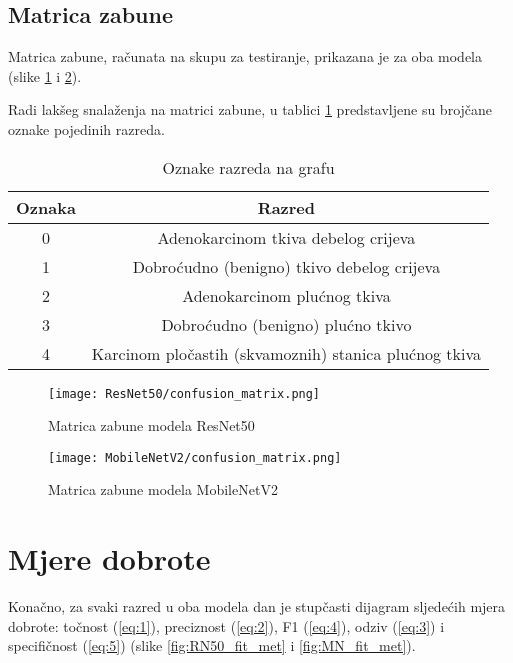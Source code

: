 \documentclass[conference, utf8]{IEEEtran}
\begin{document}
\pagebreak

\subsection{Matrica zabune}
Matrica zabune, računata na skupu za testiranje, prikazana je za oba modela (slike \ref{fig:RN50_conf_mat} i \ref{fig:MN_conf_mat}).

Radi lakšeg snalaženja na matrici zabune, u tablici \ref{table:3} predstavljene su brojčane oznake pojedinih razreda.

\begin{table}[ht]
	\centering
	\caption{Oznake razreda na grafu}
	\label{table:3}
	\begin{tabular}{ |c|c| } 
		\hline
		Oznaka & Razred \\
		\hline \hline
		0 & Adenokarcinom tkiva debelog crijeva \\
		\hline
		1 & Dobroćudno (benigno) tkivo debelog crijeva \\
		\hline
		2 & Adenokarcinom plućnog tkiva \\
		\hline
		3 & Dobroćudno (benigno) plućno tkivo \\
		\hline
		4 & Karcinom pločastih (skvamoznih) stanica plućnog tkiva \\
		\hline
	\end{tabular}
\end{table}


\begin{figure}[ht]
	\centering
	\texttt{[image: ResNet50/confusion\_matrix.png]}
	\caption{Matrica zabune modela ResNet50}
	\label{fig:RN50_conf_mat}
\end{figure}


\begin{figure}[ht]
	\centering
	\texttt{[image: MobileNetV2/confusion\_matrix.png]}
	\caption{Matrica zabune modela MobileNetV2}
	\label{fig:MN_conf_mat}
\end{figure}
\pagebreak



\section{Mjere dobrote}
 Konačno, za svaki razred u oba modela dan je stupčasti dijagram sljedećih mjera dobrote: točnost (\ref{eq:1}), preciznost (\ref{eq:2}), F1 (\ref{eq:4}), odziv (\ref{eq:3}) i specifičnost (\ref{eq:5}) (slike \ref{fig:RN50_fit_met} i \ref{fig:MN_fit_met}).
\end{document}
